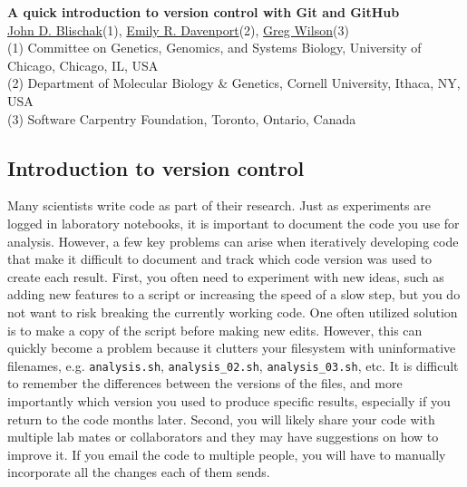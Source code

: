\documentclass[10pt]{article}
\date{}
\begin{document}
\begin{flushleft}
{\LARGE
\textbf{A quick introduction to version control with Git and GitHub}
}
\\
\href{https://www.authorea.com/users/5990}{John D. Blischak}(1),
\href{https://www.authorea.com/users/16152}{Emily R. Davenport}(2),
\href{https://www.authorea.com/users/18131}{Greg Wilson}(3)\\

(1) Committee on Genetics, Genomics, and Systems Biology, University of
Chicago, Chicago, IL, USA\\(2) Department of Molecular Biology \&
Genetics, Cornell University, Ithaca, NY, USA\\(3) Software Carpentry
Foundation, Toronto, Ontario, Canada\\





\end{flushleft}





\subsection{Introduction to version control}

Many scientists write code as part of their research.
Just as experiments are logged in laboratory notebooks, it is important to document the code you use for analysis.
However, a few key problems can arise when iteratively developing code that make it difficult to document and track which code version was used to create each result.
First, you often need to experiment with new ideas, such as adding new features to a script or increasing the speed of a slow step, but you do not want to risk breaking the currently working code.
One often utilized solution is to make a copy of the script before making new edits.
However, this can quickly become a problem because it clutters your filesystem with uninformative filenames, e.g. \verb|analysis.sh|, \verb|analysis_02.sh|, \verb|analysis_03.sh|, etc.
It is difficult to remember the differences between the versions of the files, and more importantly which version you used to produce specific results, especially if you return to the code months later.
Second, you will likely share your code with multiple lab mates or collaborators and they may have suggestions on how to improve it.
If you email the code to multiple people, you will have to manually incorporate all the changes each of them sends.
\end{document}
